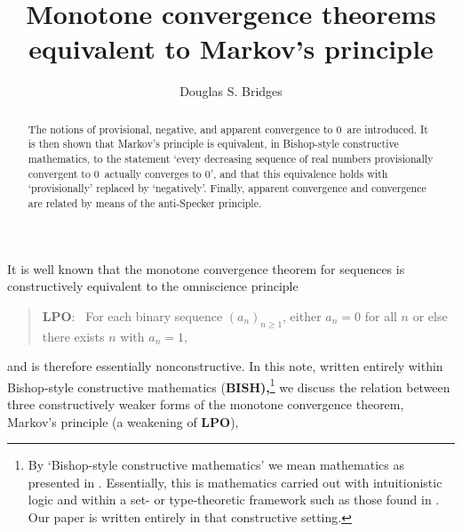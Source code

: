 \documentclass[11pt]{article}%
\begin{document}
\title{\textsf{Monotone convergence theorems equivalent to Markov's principle}}
\author{\textsf{Douglas S. Bridges}}
\maketitle

\begin{abstract}%
\noindent
\textsf{The notions of provisional, negative, and apparent convergence to }$0
$\textsf{\ are introduced. It is then shown that Markov's principle is
equivalent, in Bishop-style constructive mathematics, to the statement `every
decreasing sequence of real numbers provisionally convergent to }%
$0$\textsf{\ actually converges to }$0$\textsf{', and that this equivalence
holds with `provisionally' replaced by `negatively'. Finally, apparent
convergence and convergence are related by means of the anti-Specker
principle.}

\end{abstract}%

\bigskip
\normalfont\sf


It is well known that the monotone convergence theorem for sequences is
constructively equivalent to the omniscience principle

\begin{quote}
\textbf{LPO}: \ For each binary sequence $\left(  a_{n}\right)  _{n\geqslant1}
$, either $a_{n}=0$ for all $n$ or else there exists $n$ with $a_{n}=1,$
\end{quote}%

\noindent
and is therefore essentially nonconstructive. In this note, written entirely
within Bishop-style constructive mathematics (\textbf{BISH),}\footnote{%
\normalfont\sf
By `Bishop-style constructive mathematics' we mean mathematics as presented in
\cite{Bishop,BB,BVbook}. Essentially, this is mathematics carried out with
intuitionistic logic and within a set- or type-theoretic framework such as
those found in \cite{Balps,ML,Rathjen}. Our paper is written entirely in that
constructive setting.} we discuss the relation between three constructively
weaker forms of the monotone convergence theorem, Markov's principle (a
weakening of \textbf{LPO}),
\end{document}
